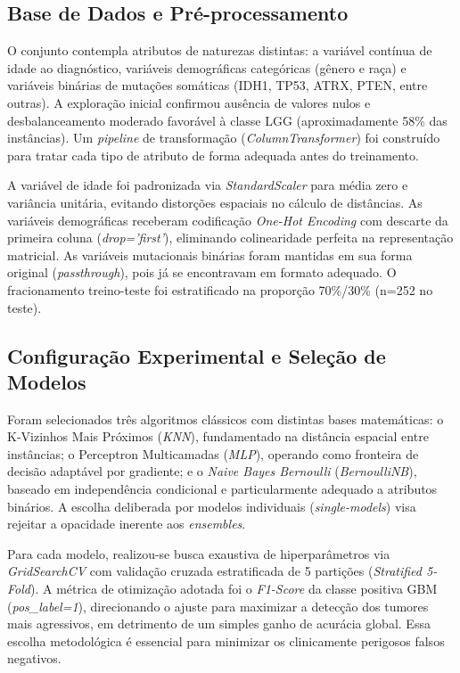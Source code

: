 \documentclass[12pt]{article}
\begin{document}
\subsection{Base de Dados e Pré-processamento}
O conjunto contempla atributos de naturezas distintas: a variável contínua de idade ao diagnóstico, variáveis demográficas categóricas (gênero e raça) e variáveis binárias de mutações somáticas (IDH1, TP53, ATRX, PTEN, entre outras). A exploração inicial confirmou ausência de valores nulos e desbalanceamento moderado favorável à classe LGG (aproximadamente 58\% das instâncias). Um \textit{pipeline} de transformação (\textit{ColumnTransformer}) foi construído para tratar cada tipo de atributo de forma adequada antes do treinamento.

A variável de idade foi padronizada via \textit{StandardScaler} para média zero e variância unitária, evitando distorções espaciais no cálculo de distâncias. As variáveis demográficas receberam codificação \textit{One-Hot Encoding} com descarte da primeira coluna (\textit{drop='first'}), eliminando colinearidade perfeita na representação matricial. As variáveis mutacionais binárias foram mantidas em sua forma original (\textit{passthrough}), pois já se encontravam em formato adequado. O fracionamento treino-teste foi estratificado na proporção 70\%/30\% (n=252 no teste).

\subsection{Configuração Experimental e Seleção de Modelos}
Foram selecionados três algoritmos clássicos com distintas bases matemáticas: o K-Vizinhos Mais Próximos (\textit{KNN}), fundamentado na distância espacial entre instâncias; o Perceptron Multicamadas (\textit{MLP}), operando como fronteira de decisão adaptável por gradiente; e o \textit{Naive Bayes Bernoulli} (\textit{BernoulliNB}), baseado em independência condicional e particularmente adequado a atributos binários. A escolha deliberada por modelos individuais (\textit{single-models}) visa rejeitar a opacidade inerente aos \textit{ensembles}.

Para cada modelo, realizou-se busca exaustiva de hiperparâmetros via \textit{GridSearchCV} com validação cruzada estratificada de 5 partições (\textit{Stratified 5-Fold}). A métrica de otimização adotada foi o \textit{F1-Score} da classe positiva GBM (\textit{pos\_label=1}), direcionando o ajuste para maximizar a detecção dos tumores mais agressivos, em detrimento de um simples ganho de acurácia global. Essa escolha metodológica é essencial para minimizar os clinicamente perigosos falsos negativos.
\end{document}

